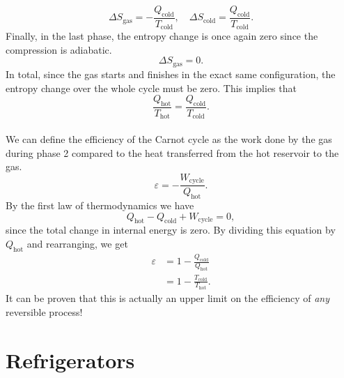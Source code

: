 \documentclass[../thermodynamics.tex]{subfiles}
\begin{document}
        \begin{equation}
            \Delta S_\text{gas}=-\frac{Q_\text{cold}}{T_\text{cold}},\quad\Delta S_\text{cold}=\frac{Q_\text{cold}}{T_\text{cold}}.
        \end{equation}
        Finally, in the last phase, the entropy change is once again zero since the compression is adiabatic.
        \begin{equation}
            \Delta S_\text{gas}=0.
        \end{equation}
        In total, since the gas starts and finishes in the exact same configuration, the entropy change over the whole cycle must be zero.
        This implies that
        \begin{equation}
            \frac{Q_\text{hot}}{T_\text{hot}}=\frac{Q_\text{cold}}{T_\text{cold}}.
        \end{equation}

        \paragraph{}
        We can define the efficiency of the Carnot cycle as the work done by the gas during phase 2 compared to the heat transferred from the hot reservoir to the gas.
        \begin{equation}
            \varepsilon=-\frac{W_\text{cycle}}{Q_\text{hot}}.
        \end{equation}
        By the first law of thermodynamics we have
        \begin{equation}
            Q_\text{hot}-Q_\text{cold}+W_\text{cycle}=0,
        \end{equation}
        since the total change in internal energy is zero.
        By dividing this equation by $Q_\text{hot}$ and rearranging, we get
        \begin{align}
            \varepsilon&=1-\frac{Q_\text{cold}}{Q_\text{hot}}\\
            &=1-\frac{T_\text{cold}}{T_\text{hot}}.
        \end{align}
        It can be proven that this is actually an upper limit on the efficiency of \textit{any} reversible process!

    \section{Refrigerators}
\end{document}
